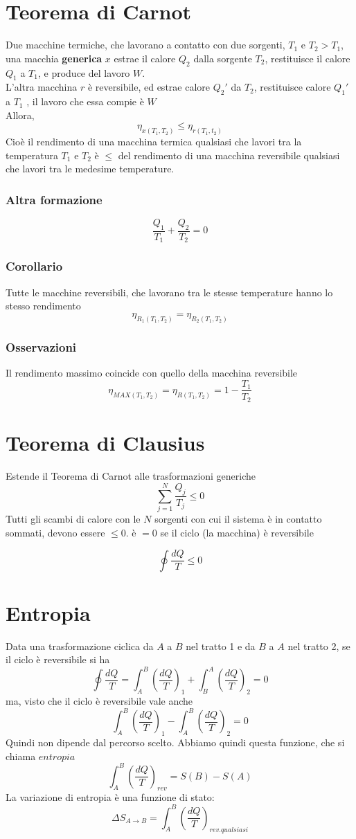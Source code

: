 \documentclass[a4paper]{report}
\begin{document}
  \section{Teorema di Carnot}
  Due macchine termiche, che lavorano a contatto con due sorgenti, $T_1$ e $T_2 > T_1$, una macchia \textbf{generica} $x$ estrae il calore $Q_2$ dalla sorgente $T_2$, restituisce il calore $Q_1$ a $T_1$, e produce del lavoro $W$. \\
  L'altra macchina $r$ è reversibile, ed estrae calore $Q_2'$ da $T_2$, restituisce calore $Q_1'$ a $T_1$ , il lavoro che essa compie è $W$\\
  Allora,
  \[ \eta_{x(T_1, T_2)}  \leq \eta_{r(T_1, t_2)} \]
  Cioè il rendimento di una macchina termica qualsiasi che lavori tra la temperatura $T_1$ e $T_2$ è $\leq$ del rendimento di una macchina reversibile qualsiasi che lavori tra le medesime temperature.
  \subsubsection{Altra formazione}
  \[ \frac{Q_1}{T_1} + \frac{Q_2}{T_2} = 0 \]

  \subsubsection{Corollario}
  Tutte le macchine reversibili, che lavorano tra le stesse temperature hanno lo stesso rendimento
  \[ \eta_{R_1(T_1, T_2)} = \eta_{R_2(T_1, T_2)} \]
  \subsubsection{Osservazioni}
  Il rendimento massimo coincide con quello della macchina reversibile
  \[ \eta_{MAX(T_1,T_2)} = \eta_{R(T_1,T_2)} = 1-\frac{T_1}{T_2} \]

  \section{Teorema di Clausius}
  Estende il Teorema di Carnot alle trasformazioni generiche
  \[ \sum_{j=1}^N \frac{Q_j}{T_j} \leq 0 \]
  Tutti gli scambi di calore con le $N$ sorgenti con cui il sistema è in contatto sommati, devono essere $\leq 0$. è $=0$ se il ciclo (la macchina) è reversibile

  \[ \oint \frac{dQ}{T} \leq 0 \]




  \section{Entropia}
  Data una trasformazione ciclica da $A$ a $B$ nel tratto 1 e da $B$ a $A$ nel tratto 2, se il ciclo è reversibile si ha
  \[ \oint \frac{dQ}{T} = \int_A^B (\frac{dQ}{T})_1 + \int_B^A (\frac{dQ}{T})_2 = 0\]
  ma, visto che il ciclo è reversibile vale anche
  \[ \int_A^B (\frac{dQ}{T})_1 - \int_A^B (\frac{dQ}{T})_2 = 0\]
  Quindi non dipende dal percorso scelto. Abbiamo quindi questa funzione, che si chiama $entropia$
  \[ \int_A^B (\frac{dQ}{T})_{rev} = S(B) -S(A) \]
  La variazione di entropia è una funzione di stato:
  \[ \Delta S_{A \rightarrow B} = \int_A^B (\frac{dQ}{T})_{rev. qualsiasi} \]
\end{document}
